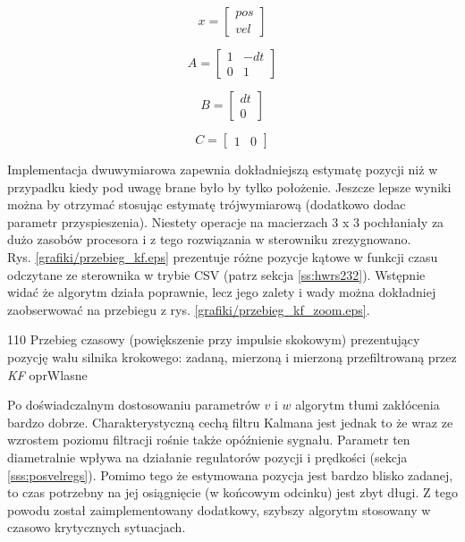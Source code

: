 \begin{equation} \label{eq:alg6}
	x = \begin{bmatrix}
       	pos \\ 
       	vel
     	\end{bmatrix}
\end{equation}

\begin{equation} \label{eq:alg7}
	A = \begin{bmatrix}
       	1 & -dt \\ 
       	0 & 1
     	\end{bmatrix}
\end{equation}

\begin{equation} \label{eq:alg8}
	B = \begin{bmatrix}
       	dt \\ 
       	0
     	\end{bmatrix}
\end{equation}

\begin{equation} \label{eq:alg9}
	C = \begin{bmatrix}
       	1 & 0 
     	\end{bmatrix}
\end{equation}

Implementacja dwuwymiarowa zapewnia dokładniejszą estymatę pozycji niż w przypadku kiedy pod uwagę brane było by tylko położenie. Jeszcze lepsze wyniki można by otrzymać stosując estymatę trójwymiarową (dodatkowo dodac parametr przyspieszenia). Niestety operacje na macierzach 3 x 3 pochłaniały za dużo zasobów procesora i z tego rozwiązania w sterowniku zrezygnowano. \\

Rys. \ref{grafiki/przebieg_kf.eps} prezentuje różne pozycje kątowe w funkcji czasu odczytane ze sterownika w trybie CSV (patrz sekcja \ref{ss:hwrs232}). Wstępnie widać że algorytm działa poprawnie, lecz jego zalety i wady można dokładniej zaobserwować na przebiegu z rys. \ref{grafiki/przebieg_kf_zoom.eps}.

	{110}
	{Przebieg czasowy (powiększenie przy impulsie skokowym) prezentujący pozycję wału silnika krokowego: zadaną, mierzoną i mierzoną przefiltrowaną przez {\it KF}}
	{oprWlasne}
	
Po doświadczalnym dostosowaniu parametrów $ v $ i $ w $ algorytm tłumi zakłócenia bardzo dobrze. Charakterystyczną cechą filtru Kalmana jest jednak to że wraz ze wzrostem poziomu filtracji rośnie także opóźnienie sygnału. Parametr ten diametralnie wpływa na działanie regulatorów pozycji i prędkości (sekcja \ref{sss:posvelregs}). Pomimo tego że estymowana pozycja jest bardzo blisko zadanej, to czas potrzebny na jej osiągnięcie (w końcowym odcinku) jest zbyt długi. Z tego powodu został zaimplementowany dodatkowy, szybszy algorytm stosowany w czasowo krytycznych sytuacjach.

